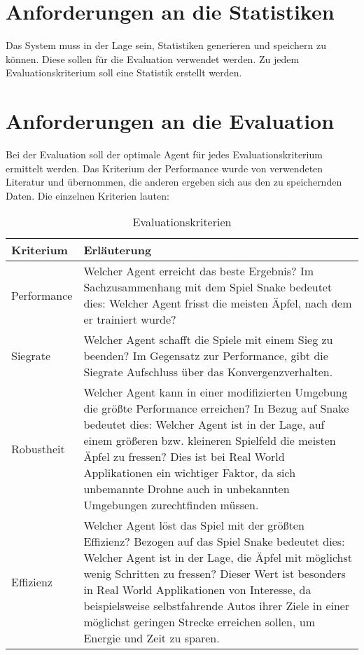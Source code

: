 \section{Anforderungen an die Statistiken} \label{sec:Anforderungen_Statistik}
Das System muss in der Lage sein, Statistiken generieren und speichern zu können. Diese sollen für die Evaluation verwendet werden. Zu jedem Evaluationskriterium  soll eine Statistik erstellt werden. 

\section{Anforderungen an die Evaluation} \label{sec:Anforderungen_an_die_Evaluation}
Bei der Evaluation soll der optimale Agent für jedes Evaluationskriterium ermittelt werden.
Das Kriterium der Performance wurde von verwendeten Literatur \cite{Autonomous_Agents_in_Snake_Game_via_DRL} und \cite{UAV} übernommen, die anderen ergeben sich aus den zu speichernden Daten.
Die einzelnen Kriterien lauten:
\begin{longtable}[h]{|p{4cm}|p{\linewidth - 5cm}|}
	\caption{Evaluationskriterien}
	\label{tab:Anforderungen_Kriterien} 
	\endfirsthead
	\endhead
	\hline
	Kriterium & Erläuterung \\
	\hline
	Performance & Welcher Agent erreicht das beste Ergebnis? Im Sachzusammenhang mit dem Spiel Snake bedeutet dies: Welcher Agent frisst die meisten Äpfel, nach dem er trainiert wurde?\\
	\hline
	Siegrate & Welcher Agent schafft die Spiele mit einem Sieg zu beenden? Im Gegensatz zur Performance, gibt die Siegrate Aufschluss über das Konvergenzverhalten.\\
	\hline
	Robustheit & Welcher Agent kann in einer modifizierten Umgebung die größte Performance erreichen? In Bezug auf Snake bedeutet dies: Welcher Agent ist in der Lage, auf einem größeren bzw. kleineren Spielfeld die meisten Äpfel zu fressen? Dies ist bei Real World Applikationen ein wichtiger Faktor, da sich unbemannte Drohne auch in unbekannten Umgebungen zurechtfinden müssen.\\
	\hline
	Effizienz & Welcher Agent löst das Spiel mit der größten Effizienz? Bezogen auf das Spiel Snake bedeutet dies: Welcher Agent ist in der Lage, die Äpfel mit möglichst wenig Schritten zu fressen? Dieser Wert ist besonders in Real World Applikationen von Interesse, da beispielsweise selbstfahrende Autos ihrer Ziele in einer möglichst geringen Strecke erreichen sollen, um Energie und Zeit zu sparen.\\
	\hline
\end{longtable}